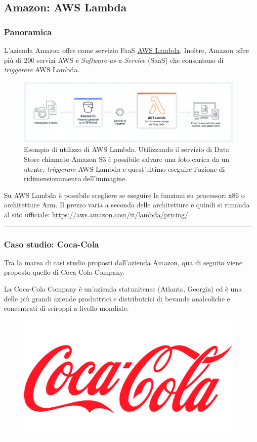 \documentclass[a4paper]{article}
\newcommand{\longline}{\noindent\rule{\textwidth}{0.4pt}}
\begin{document}
	\subsection{Amazon: AWS Lambda}
	
	\subsubsection{Panoramica}
	
	L'azienda Amazon offre come servizio FaaS \href{https://aws.amazon.com/lambda/?nc2=h_ql_prod_fs_lbd}{AWS Lambda}. Inoltre, Amazon offre più di 200 servizi AWS e \emph{Software-as-a-Service} (SaaS) che consentono di \emph{triggerare} AWS Lambda.
	\begin{figure}[!htp]
		\centering
		\includegraphics[width=\textwidth]{img/AWS-Lambda-1.png}
		\caption{Esempio di utilizzo di AWS Lambda. Utilizzando il servizio di Data Store chiamato Amazon S3 è possibile salvare una foto carica da un utente, \emph{triggerare} AWS Lambda e quest'ultimo eseguire l'azione di ridimensionamento dell'immagine.}
	\end{figure}
	
	\noindent
	Su AWS Lambda è possibile scegliere se eseguire le funzioni su processori x86 o architetture Arm. Il prezzo varia a seconda delle architetture e quindi si rimanda al sito ufficiale: \url{https://aws.amazon.com/it/lambda/pricing/}
	
	\longline
	
	\subsubsection{Caso studio: Coca-Cola}
	
	Tra la marea di casi studio proposti dall'azienda Amazon, qua di seguito viene proposto quello di Coca-Cola Company.\newline
	
	\noindent
	La Coca-Cola Company è un'azienda statunitense (Atlanta, Georgia) ed è una delle più grandi aziende produttrici e distributrici di bevande analcoliche e concentrati di sciroppi a livello mondiale.
	\begin{figure}[!htp]
		\centering
		\includegraphics[width=.4\textwidth]{img/Coca-Cola-1.png}
	\end{figure}\newpage
	
\end{document}
